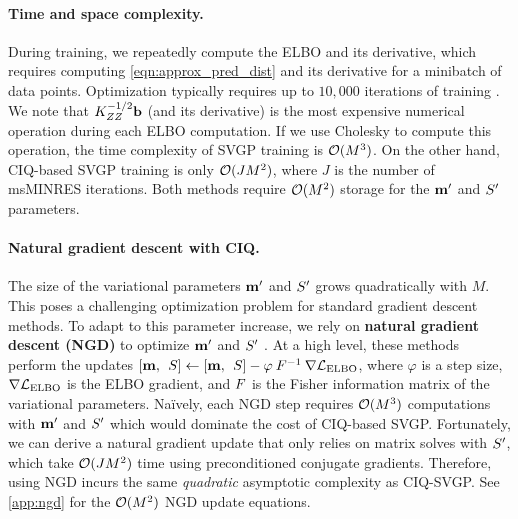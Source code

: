 \paragraph{Time and space complexity.}
During training, we repeatedly compute the ELBO and its derivative, which requires computing \cref{eqn:approx_pred_dist} and its derivative for a minibatch of data points.
Optimization typically requires up to $10,\!000$ iterations of training \citep[e.g.][]{salimbeni2018natural}.
We note that $K_{ZZ}^{-1 / 2} \mathbf{b}$ (and its derivative) is the most expensive numerical operation during each ELBO computation.
If we use Cholesky to compute this operation, the time complexity of SVGP training is $\bigo{M^3}$.
On the other hand, CIQ-based SVGP training is only $\bigo{J M^2}$, where $J$ is the number of msMINRES iterations.
Both methods require $\bigo{M^2}$ storage for the $\mathbf{m}'$ and $S'$ parameters.

\paragraph{Natural gradient descent with CIQ.}
The size of the variational parameters $\mathbf{m}'$ and $S'$ grows quadratically with $M$.
This poses a challenging optimization problem for standard gradient descent methods.
To adapt to this parameter increase, we rely on {\bf natural gradient descent (NGD)} to optimize $\mathbf{m}'$ and $S'$ \citep[e.g.][]{hensman2012fast,salimbeni2018natural}.
At a high level, these methods perform the updates $[\mathbf{m}, \:\: S] \gets [\mathbf{m}, \:\: S] - \varphi \: F^{-1} \: \nabla \mathcal L_\text{ELBO}$,
where $\varphi$ is a step size, $\nabla \mathcal L_\text{ELBO}$ is the ELBO gradient, and $F$ is the {Fisher information matrix} of the variational parameters.
%
Na\"ively, each NGD step requires $\bigo{M^3}$ computations with $\mathbf{m}'$ and $S'$ which would dominate the cost of CIQ-based SVGP.
Fortunately, we can derive a natural gradient update that only relies on matrix solves with $S'$, which take $\bigo{J M^2}$ time using preconditioned conjugate gradients.
Therefore, using NGD incurs the same \emph{quadratic} asymptotic complexity as CIQ-SVGP.
See \cref{app:ngd} for the $\bigo{M^2}$ NGD update equations.

